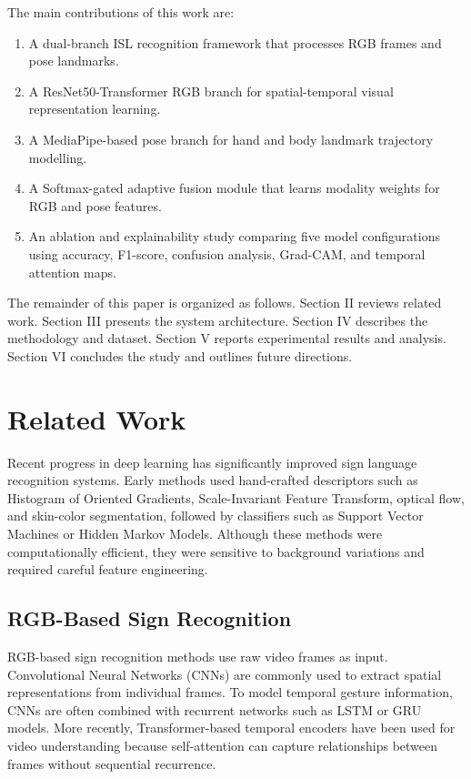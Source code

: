 \documentclass[conference]{IEEEtran}
\begin{document}
The main contributions of this work are:
\begin{enumerate}
    \item A dual-branch ISL recognition framework that processes RGB frames and pose landmarks.
    \item A ResNet50-Transformer RGB branch for spatial-temporal visual representation learning.
    \item A MediaPipe-based pose branch for hand and body landmark trajectory modelling.
    \item A Softmax-gated adaptive fusion module that learns modality weights for RGB and pose features.
    \item An ablation and explainability study comparing five model configurations using accuracy, F1-score, confusion analysis, Grad-CAM, and temporal attention maps.
\end{enumerate}

The remainder of this paper is organized as follows. Section II reviews related work. Section III presents the system architecture. Section IV describes the methodology and dataset. Section V reports experimental results and analysis. Section VI concludes the study and outlines future directions.

\section{Related Work}

Recent progress in deep learning has significantly improved sign language recognition systems. Early methods used hand-crafted descriptors such as Histogram of Oriented Gradients, Scale-Invariant Feature Transform, optical flow, and skin-color segmentation, followed by classifiers such as Support Vector Machines or Hidden Markov Models. Although these methods were computationally efficient, they were sensitive to background variations and required careful feature engineering.

\subsection{RGB-Based Sign Recognition}

RGB-based sign recognition methods use raw video frames as input. Convolutional Neural Networks (CNNs) are commonly used to extract spatial representations from individual frames. To model temporal gesture information, CNNs are often combined with recurrent networks such as LSTM or GRU models. More recently, Transformer-based temporal encoders have been used for video understanding because self-attention can capture relationships between frames without sequential recurrence.
\end{document}
